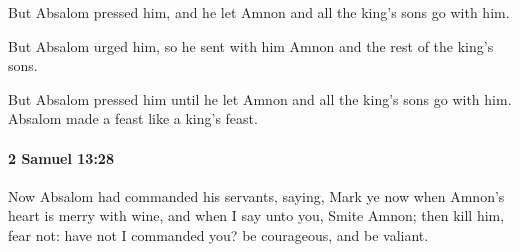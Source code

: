 			\begin{versebox}
					\item[BHS] 
					\item[ASV] But Absalom pressed him, and he let Amnon and all the king's sons go with him.
					\item[NIV] But Absalom urged him, so he sent with him Amnon and the rest of the king’s sons.
					\item[NRSV] But Absalom pressed him until he let Amnon and all the king’s sons go with him. Absalom made a feast like a king’s feast.
			\end{versebox}

		\paragraph{2 Samuel 13:28} %
			\label{2SAMUEL-13-28}

			Now Absalom had commanded his servants, saying, Mark ye now when Amnon’s heart is merry with wine, and when I say unto you, Smite Amnon; then kill him, fear not: have not I commanded you? be courageous, and be valiant.


